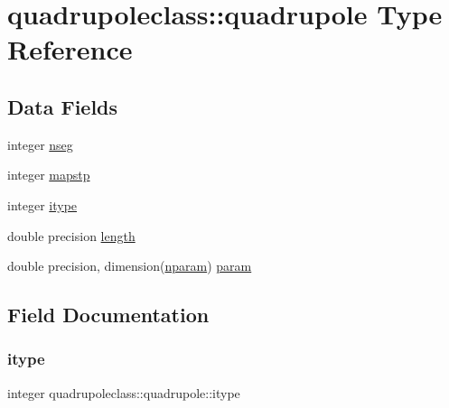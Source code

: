\hypertarget{structquadrupoleclass_1_1quadrupole}{}\section{quadrupoleclass\+::quadrupole Type Reference}
\label{structquadrupoleclass_1_1quadrupole}
\subsection*{Data Fields}
\begin{DoxyCompactItemize}
\item 
integer \mbox{\hyperlink{structquadrupoleclass_1_1quadrupole_afece7d333f73554720932318f413f11b}{nseg}}
\item 
integer \mbox{\hyperlink{structquadrupoleclass_1_1quadrupole_a283a967adb1fb9dd7c742b5ce97ef3a0}{mapstp}}
\item 
integer \mbox{\hyperlink{structquadrupoleclass_1_1quadrupole_addaf50b0cff1aec9fc452925c7819bdb}{itype}}
\item 
double precision \mbox{\hyperlink{structquadrupoleclass_1_1quadrupole_ac84e0debf991be5cd71ee964781dd7af}{length}}
\item 
double precision, dimension(\mbox{\hyperlink{namespacequadrupoleclass_a8eba81bd9796e431c21d0f46260b0c6c}{nparam}}) \mbox{\hyperlink{structquadrupoleclass_1_1quadrupole_ab9bcd11b6a6e1b6d7242eb243029393f}{param}}
\end{DoxyCompactItemize}


\subsection{Field Documentation}
\mbox{\label{structquadrupoleclass_1_1quadrupole_addaf50b0cff1aec9fc452925c7819bdb}} 
\subsubsection{\texorpdfstring{itype}{itype}}
{\footnotesize\ttfamily integer quadrupoleclass\+::quadrupole\+::itype}

\mbox{\label{structquadrupoleclass_1_1quadrupole_ac84e0debf991be5cd71ee964781dd7af}} 
